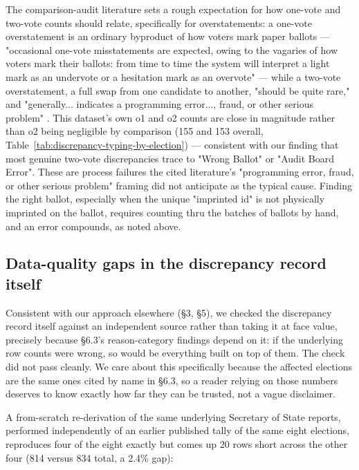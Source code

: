 The comparison-audit literature sets a rough expectation for how one-vote
and two-vote counts should relate, specifically for overstatements: a
one-vote overstatement is an ordinary byproduct of how voters mark paper
ballots — "occasional one-vote misstatements are expected, owing to the
vagaries of how voters mark their ballots: from time to time the system
will interpret a light mark as an undervote or a hesitation mark as an
overvote" — while a two-vote overstatement, a full swap from one
candidate to another, "should be quite rare," and "generally... indicates
a programming error..., fraud, or other serious problem"
\cite{lindeman2012gentle, stark2010supersimple}. This dataset's own o1
and o2 counts are close in magnitude rather than o2 being negligible by
comparison (155 and 153 overall, Table~\ref{tab:discrepancy-typing-by-election}) — consistent with
our finding that most genuine two-vote discrepancies trace to "Wrong Ballot"
or "Audit Board Error". These are process failures the cited literature's
"programming error, fraud, or other serious problem" framing did not
anticipate as the typical cause. Finding the right ballot, especially
when the unique "imprinted id" is not physically imprinted on the ballot,
requires counting thru the batches of ballots by hand, and an error
compounds, as noted above.

\subsection{Data-quality gaps in the discrepancy record itself}

Consistent with our approach elsewhere (§3, §5), we checked the
discrepancy record itself against an independent source rather than
taking it at face value, precisely because §6.3's reason-category
findings depend on it: if the underlying row counts were wrong, so would
be everything built on top of them. The check did not pass cleanly. We
care about this specifically because the affected elections are the same
ones cited by name in §6.3, so a reader relying on those numbers deserves
to know exactly how far they can be trusted, not a vague disclaimer.

A from-scratch re-derivation of the same underlying Secretary of State
reports, performed independently of an earlier published tally of the
same eight elections, reproduces four of the eight exactly but comes up
20 rows short across the other four (814 versus 834 total, a 2.4\% gap):

